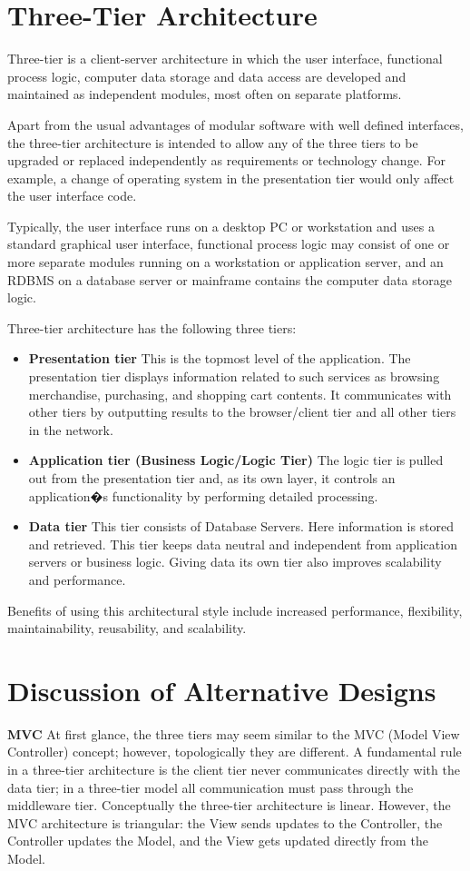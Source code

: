 \documentclass[a4paper, 12pt]{report}
\begin{document}
\section{Three-Tier Architecture}
Three-tier is a client-server architecture in which the user interface, functional process logic, computer data storage and data access are developed and maintained as independent modules, most often on separate platforms.

Apart from the usual advantages of modular software with well defined interfaces, the three-tier architecture is intended to allow any of the three tiers to be upgraded or replaced independently as requirements or technology change. For example, a change of operating system in the presentation tier would only affect the user interface code.

Typically, the user interface runs on a desktop PC or workstation and uses a standard graphical user interface, functional process logic may consist of one or more separate modules running on a workstation or application server, and an RDBMS on a database server or mainframe contains the computer data storage logic.

Three-tier architecture has the following three tiers:
\begin{itemize}
\item \textbf{Presentation tier}
This is the topmost level of the application. The presentation tier displays information related to such services as browsing merchandise, purchasing, and shopping cart contents. It communicates with other tiers by outputting results to the browser/client tier and all other tiers in the network.
\item \textbf{Application tier (Business Logic/Logic Tier)}
The logic tier is pulled out from the presentation tier and, as its own layer, it controls an application�s functionality by performing detailed processing.
\item \textbf{Data tier}
This tier consists of Database Servers. Here information is stored and retrieved. This tier keeps data neutral and independent from application servers or business logic. Giving data its own tier also improves scalability and performance. 
\end{itemize}

Benefits of using this architectural style include increased performance, flexibility, maintainability, reusability, and scalability.
\section{Discussion of Alternative Designs}
\textbf{MVC}
At first glance, the three tiers may seem similar to the MVC (Model View Controller) concept; however, topologically they are different. A fundamental rule in a three-tier architecture is the client tier never communicates directly with the data tier; in a three-tier model all communication must pass through the middleware tier. Conceptually the three-tier architecture is linear. However, the MVC architecture is triangular: the View sends updates to the Controller, the Controller updates the Model, and the View gets updated directly from the Model.
\end{document}
